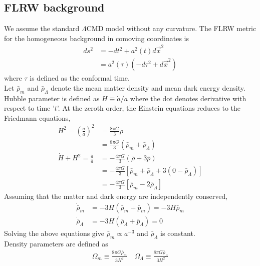 \documentclass[12pt]{article}
\begin{document}
\subsection{FLRW background}
\label{sec:flrw-background}
We assume the standard $\Lambda$CMD model without any curvature. The FLRW metric for the homogeneous background in comoving coordinates is
\begin{align}
ds^2 &= -dt^2 + a^2(t) d\vec{x}^2\\
&= a^2(\tau) \left( -d\tau^2 + d\vec{x}^2 \right) 
\end{align}
where $\tau$ is defined as the conformal time.\\
Let $\bar{\rho}_{m}$ and $\bar{\rho}_{\Lambda}$ denote the mean matter density and mean dark energy density. Hubble parameter is defined as $H \equiv \dot{a}/a$ where the dot denotes derivative with respect to time '$t$'. At the zeroth order, the Einstein equations reduces to the Friedmann equations,
\begin{align}
\nonumber
H^2 = \left(\frac{\dot{a}}{a}\right)^2 &= \frac{8 \pi G}{3} \bar{\rho} \\
\label{eq:fried-eqn-1}
&= \frac{8 \pi G}{3} \left( \bar{\rho}_{m} + \bar{\rho}_{\Lambda} \right) \\
\nonumber
\dot{H} + H^2 = \frac{\ddot{a}}{a} &= - \frac{4\pi G}{3} \left(\bar{\rho} + 3\bar{p} \right)\\
\nonumber
&= - \frac{4\pi G}{3} \left[ \bar{\rho}_{m} + \bar{\rho}_{\Lambda} + 3 (0 -\bar{\rho}_{\Lambda}) \right]\\
\label{eq:fried-eqn-2}
&= - \frac{4\pi G}{3} \left[ \bar{\rho}_{m} - 2 \bar{\rho}_{\Lambda} \right] 
\end{align}
%
Assuming that the matter and dark energy are independently conserved,
\begin{align}
\dot{\bar{\rho}}_{m} &= -3 H \left(\bar{\rho}_{m} + {\bar{p}_{m}}\right) = - 3 H \bar{\rho}_{m} \\
\dot{\bar{\rho}}_{\Lambda} &= -3 H \left(\bar{\rho}_{\Lambda} + \bar{p}_{\Lambda} \right) = 0
\end{align}
Solving the above equations give $\bar{\rho}_{m} \propto a^{-3}$ and $\bar{\rho}_{\Lambda}$ is constant.\\
Density parameters are defined as
\begin{align}
\Omega_{m} \equiv \frac{8 \pi G \bar{\rho}_{m}}{3 H^2} \quad
\Omega_{\Lambda} \equiv \frac{8 \pi G \bar{\rho}_{\Lambda}}{3 H^2}
\end{align}
\end{document}
